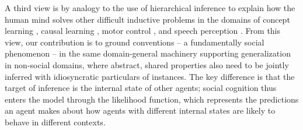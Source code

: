 A third view is by analogy to the use of hierarchical inference to explain how the human mind solves other difficult inductive problems in the domains of concept learning \cite{KempPerforsTenenbaum07_HBM, tenenbaum_how_2011}, causal learning \cite{KempGoodmanTenenbaum10_LearningToLearn,GoodmanUllmanTenenbaum11_TheoryOfCausality},  motor control \cite{berniker2008estimating}, and speech perception \cite{kleinschmidt2015robust}.
From this view, our contribution is to ground conventions -- a fundamentally social phenomenon -- in the same domain-general machinery supporting generalization in non-social domains, where abstract, shared properties also need to be jointly inferred with idiosyncratic particulars of instances.
The key difference is that the target of inference is the internal state of other agents; social cognition thus enters the model through the likelihood function, which represents the predictions an agent makes about how agents with different internal states are likely to behave in different contexts.


